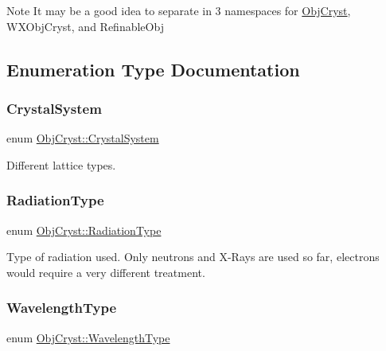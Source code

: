 \begin{DoxyNote}{Note}
It may be a good idea to separate in 3 namespaces for \mbox{\hyperlink{namespace_obj_cryst}{Obj\+Cryst}}, W\+X\+Obj\+Cryst, and Refinable\+Obj 
\end{DoxyNote}


\subsection{Enumeration Type Documentation}
\mbox{\label{namespace_obj_cryst_a9cd1d00f4ec9f0e75564ee151f47dd83}} 
\subsubsection{\texorpdfstring{CrystalSystem}{CrystalSystem}}
{\footnotesize\ttfamily enum \mbox{\hyperlink{namespace_obj_cryst_a9cd1d00f4ec9f0e75564ee151f47dd83}{Obj\+Cryst\+::\+Crystal\+System}}}

Different lattice types. \mbox{\label{namespace_obj_cryst_a48fe50a094c607f8897378934d3d73ef}} 
\subsubsection{\texorpdfstring{RadiationType}{RadiationType}}
{\footnotesize\ttfamily enum \mbox{\hyperlink{namespace_obj_cryst_a48fe50a094c607f8897378934d3d73ef}{Obj\+Cryst\+::\+Radiation\+Type}}}

Type of radiation used. Only neutrons and X-\/\+Rays are used so far, electrons would require a very different treatment. \mbox{\label{namespace_obj_cryst_a551a5807d5afe2d986758d9a6953a880}} 
\subsubsection{\texorpdfstring{WavelengthType}{WavelengthType}}
{\footnotesize\ttfamily enum \mbox{\hyperlink{namespace_obj_cryst_a551a5807d5afe2d986758d9a6953a880}{Obj\+Cryst\+::\+Wavelength\+Type}}}

